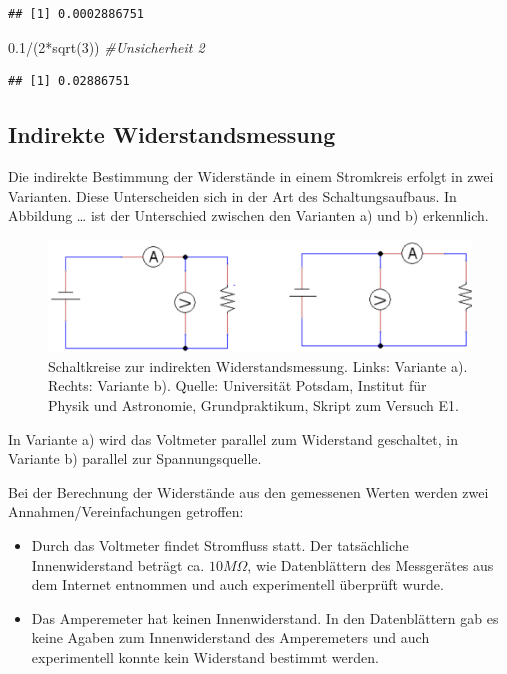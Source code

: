 \documentclass[
  9pt,
]{article}
\newenvironment{Shaded}{\begin{snugshade}}{\end{snugshade}}
\newcommand{\CommentTok}[1]{\textcolor[rgb]{0.56,0.35,0.01}{\textit{#1}}}
\newcommand{\DecValTok}[1]{\textcolor[rgb]{0.00,0.00,0.81}{#1}}
\newcommand{\FloatTok}[1]{\textcolor[rgb]{0.00,0.00,0.81}{#1}}
\newcommand{\FunctionTok}[1]{\textcolor[rgb]{0.00,0.00,0.00}{#1}}
\newcommand{\NormalTok}[1]{#1}
\newcommand{\SpecialCharTok}[1]{\textcolor[rgb]{0.00,0.00,0.00}{#1}}
\begin{document}
\begin{verbatim}
## [1] 0.0002886751
\end{verbatim}

\begin{Shaded}
\begin{Highlighting}[]
\FloatTok{0.1}\SpecialCharTok{/}\NormalTok{(}\DecValTok{2}\SpecialCharTok{*}\FunctionTok{sqrt}\NormalTok{(}\DecValTok{3}\NormalTok{)) }\CommentTok{\#Unsicherheit 2}
\end{Highlighting}
\end{Shaded}

\begin{verbatim}
## [1] 0.02886751
\end{verbatim}

\hypertarget{indirekte-widerstandsmessung}{%
\subsection{Indirekte
Widerstandsmessung}\label{indirekte-widerstandsmessung}}

Die indirekte Bestimmung der Widerstände in einem Stromkreis erfolgt in
zwei Varianten. Diese Unterscheiden sich in der Art des
Schaltungsaufbaus. In Abbildung \ldots{} ist der Unterschied zwischen
den Varianten a) und b) erkennlich.

\begin{figure}
\centering
\includegraphics[width=\textwidth,height=0.1\textheight]{Bilder/Schaltkreis.png}
\caption{Schaltkreise zur indirekten Widerstandsmessung. Links: Variante
a). Rechts: Variante b). Quelle: Universität Potsdam, Institut für
Physik und Astronomie, Grundpraktikum, Skript zum Versuch E1.}
\end{figure}

In Variante a) wird das Voltmeter parallel zum Widerstand geschaltet, in
Variante b) parallel zur Spannungsquelle.

Bei der Berechnung der Widerstände aus den gemessenen Werten werden zwei
Annahmen/Vereinfachungen getroffen:

\begin{itemize}
  \item Durch das Voltmeter findet Stromfluss statt. Der tatsächliche Innenwiderstand beträgt ca. $10M\Omega$, wie Datenblättern des Messgerätes aus dem Internet entnommen und auch experimentell überprüft wurde.
  \item Das Amperemeter hat keinen Innenwiderstand. In den Datenblättern gab es keine Agaben zum Innenwiderstand des Amperemeters und auch experimentell konnte kein Widerstand bestimmt werden.
\end{itemize}
\end{document}
